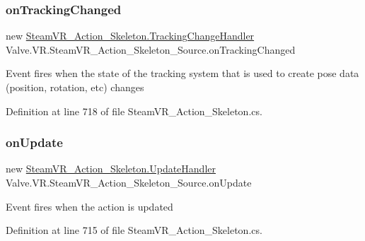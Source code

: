 \subsubsection{\texorpdfstring{onTrackingChanged}{onTrackingChanged}}
{\footnotesize\ttfamily new \mbox{\hyperlink{class_valve_1_1_v_r_1_1_steam_v_r___action___skeleton_a460bcda41aa359ec14435212bed2b856}{Steam\+V\+R\+\_\+\+Action\+\_\+\+Skeleton.\+Tracking\+Change\+Handler}} Valve.\+V\+R.\+Steam\+V\+R\+\_\+\+Action\+\_\+\+Skeleton\+\_\+\+Source.\+on\+Tracking\+Changed}



Event fires when the state of the tracking system that is used to create pose data (position, rotation, etc) changes 



Definition at line 718 of file Steam\+V\+R\+\_\+\+Action\+\_\+\+Skeleton.\+cs.

\mbox{\label{class_valve_1_1_v_r_1_1_steam_v_r___action___skeleton___source_a5ad6626808b28b817fc06003b1a9ca6a}} 
\subsubsection{\texorpdfstring{onUpdate}{onUpdate}}
{\footnotesize\ttfamily new \mbox{\hyperlink{class_valve_1_1_v_r_1_1_steam_v_r___action___skeleton_a9fd666c2f3ccefc435275d85c525337c}{Steam\+V\+R\+\_\+\+Action\+\_\+\+Skeleton.\+Update\+Handler}} Valve.\+V\+R.\+Steam\+V\+R\+\_\+\+Action\+\_\+\+Skeleton\+\_\+\+Source.\+on\+Update}



Event fires when the action is updated 



Definition at line 715 of file Steam\+V\+R\+\_\+\+Action\+\_\+\+Skeleton.\+cs.

\mbox{\label{class_valve_1_1_v_r_1_1_steam_v_r___action___skeleton___source_a6fe9e466864ed83e2bb05bd40a1fc8b0}} 
